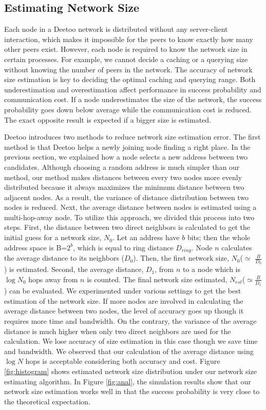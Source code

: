 \documentclass[conference]{IEEEtran}
\begin{document}
\subsection{Estimating Network Size}
Each node in a Deetoo network is distributed without any 
server-client interaction, which makes it impossible for the peers to know exactly how many other peers 
exist. However, each node is required to know the network size in certain processes. 
For example, we cannot decide a caching or a 
querying size without knowing the number of peers in the network.
The accuracy of network size estimation is key to deciding the optimal 
caching and querying range. 
Both underestimation and overestimation 
affect performance in success probability and communication cost. 
If a node underestimates the size of the network, 
the success probability goes down below average while the communication 
cost is reduced. The exact opposite result is expected if a bigger size 
is estimated. 

Deetoo introduces two methods to reduce network size estimation error. 
The first method is that Deetoo helps a newly joining node finding a 
right place. In the previous section, we explained 
how a node selects a new address between two candidates. 
Although choosing a random address is much simpler than our method, 
our method makes distances between every two nodes more evenly distributed 
because it always maximizes the minimum distance between two adjacent nodes. 
As a result, the variance of distance distribution between two nodes is reduced.  
Next, the average distance between nodes is estimated using a multi-hop-away node. 
To utilize this approach, we divided this process into two steps. 
First, the distance between two direct neighbors is calculated 
to get the initial guess for a network size, $N_0$.
Let an address have $b$ bits; then the whole address space is B=$2^{b}$, which
is equal to ring distance $D_{ring}$.  Node $n$ calculates the 
average distance to its neighbors ($D_0$). Then, the first
network size, $N_0$($\simeq$ $\frac{B}{D_0}$) is estimated. 
Second, the average distance, $D_1$, from $n$ to a node 
which is $\log N_0$ hops away from $n$ is counted. The final network size 
estimated, $N_{est}$($\simeq \frac{B}{D_1}$) can be evaluated.
We experimented under various settings to get the best estimation 
of the network size. If more nodes are involved in calculating the average 
distance between two nodes, the level of accuracy goes up though it requires 
more time and bandwidth. On the contrary, the variance of the average distance 
is much higher when only two direct neighbors are used for the calculation. 
We lose accuracy of size estimation in this case though we save 
time and bandwidth.
We observed that our calculation of the average distance using $\log N$ 
hops is acceptable considering both accuracy and cost. 
Figure \ref{fig:histogram} shows estimated network size distribution under our 
network size estimating algorithm. 
In Figure \ref{fig:anal}, the simulation results show that our network 
size estimation works well in that the success probability is very close to 
the theoretical expectation.
\end{document}
